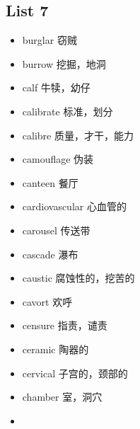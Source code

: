 \documentclass[a4paper,10pt]{article}
\begin{document}
\begin{CJK*}{UTF8}{gkai}
\section{List 7}
\begin{itemize}
\item burglar 窃贼 
\hspace{1cm}
\item burrow 挖掘，地洞
\hspace{1cm}
\item calf 牛犊，幼仔
\hspace{1cm}
\item calibrate 标准，划分
\hspace{1cm}
\item calibre 质量，才干，能力
\hspace{1cm}
\item camouflage 伪装
\hspace{1cm}
\item canteen 餐厅
\hspace{1cm}
\item cardiovascular 心血管的
\hspace{1cm}
\item carousel 传送带
\hspace{1cm}
\item cascade 瀑布
\hspace{1cm}
\item caustic 腐蚀性的，挖苦的
\hspace{1cm}
\item cavort 欢呼
\hspace{1cm}
\item censure 指责，谴责 
\hspace{1cm}
\item ceramic 陶器的
\hspace{1cm}
\item cervical 子宫的，颈部的
\hspace{1cm}
\item chamber 室，洞穴
\hspace{1cm}
\item 
\end{itemize}

\newpage

\end{CJK*}
\end{document}
